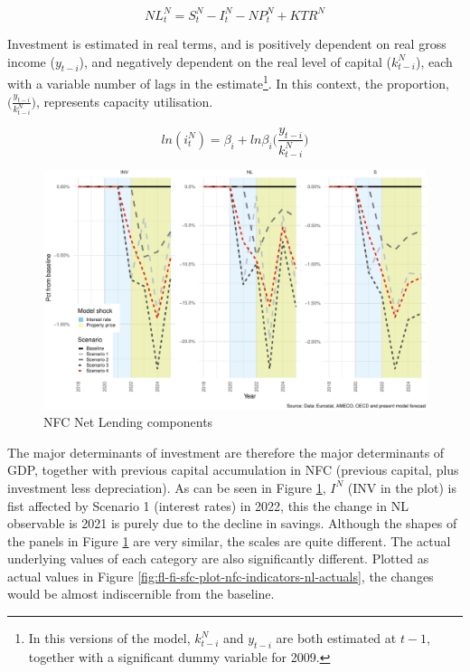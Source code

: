 \documentclass[
]{book}
\begin{document}
\begin{equation}
NL^N_t = S^N_t - I^N_t- NP^N_t + KTR^N
\end{equation}

Investment is estimated in real terms, and is positively dependent on real gross income (\(y_{t-i}\)), and negatively dependent on the real level of capital (\(k^N_{t-i}\)), each with a variable number of lags in the estimate\footnote{In this versions of the model, \(k^N_{t-i}\) and \(y_{t-i}\) are both estimated at \(t-1\), together with a significant dummy variable for 2009.}. In this context, the proportion, \(\Bigg( \frac{y_{t-i}}{k^N_{t-i}} \Bigg)\), represents capacity utilisation.

\begin{equation}
ln(i^N_t) = \beta _i + ln\beta _i \Bigg( \frac{y_{t-i}}{k^N_{t-i}}\Bigg)
\end{equation}

\begin{figure}
\centering
\includegraphics{figures/fl-fi-sfc-plot-nfc-indicators-nl-1.pdf}
\caption{\label{fig:fl-fi-sfc-plot-nfc-indicators-nl}NFC Net Lending components}
\end{figure}

The major determinants of investment are therefore the major determinants of GDP, together with previous capital accumulation in NFC (previous capital, plus investment less depreciation). As can be seen in Figure \ref{fig:fl-fi-sfc-plot-nfc-indicators-nl}, \(I^N\) (INV in the plot) is fist affected by Scenario 1 (interest rates) in 2022, this the change in NL observable is 2021 is purely due to the decline in savings. Although the shapes of the panels in Figure \ref{fig:fl-fi-sfc-plot-nfc-indicators-nl} are very similar, the scales are quite different. The actual underlying values of each category are also significantly different. Plotted as actual values in Figure \ref{fig:fl-fi-sfc-plot-nfc-indicators-nl-actuals}, the changes would be almost indiscernible from the baseline.
\end{document}
